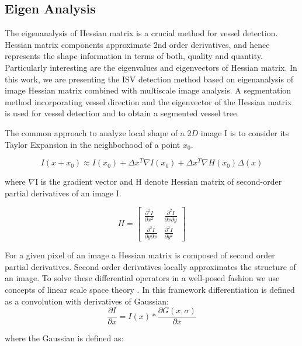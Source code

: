 \subsection{Eigen Analysis}

The eigenanalysis of Hessian matrix is a crucial method for vessel detection. Hessian matrix components approximate 2nd order derivatives, and hence represents the shape information in terms of both, quality and quantity. Particularly interesting are the eigenvalues and eigenvectors of Hessian matrix. In this work, we are presenting the ISV detection method based on eigenanalysis of image Hessian matrix combined with multiscale image analysis. A segmentation method incorporating vessel direction and the eigenvector of the Hessian matrix is used for vessel detection and to obtain a segmented vessel tree.

The common approach to analyze local shape of a $2D$ image I is to consider its Taylor Expansion in the neighborhood of a point $x_{0}$. 

\begin{equation}
I(x + x_{0}) \approx I(x_{0}) + \Delta x^{T} \nabla I(x_{0}) + \Delta x^{T} \nabla H(x_{0}) \Delta (x)
\end{equation}

where $\nabla$I is the gradient vector and H denote Hessian matrix of second-order partial derivatives of an image I.

\begin{equation}
H = \begin{bmatrix}
\frac{\partial^2 I}{\partial x^2}&\frac{\partial^2 I}{\partial x \partial y}\\ \frac{\partial^2 I}{\partial y \partial x}&\frac{\partial^2 I}{\partial y^2}
\end{bmatrix}
\end{equation}

For a given pixel of an image a Hessian matrix is composed of second order partial derivatives. Second order derivatives locally approximates the structure of an image. To solve these differential operators in a well-posed fashion we use concepts of linear scale space theory \cite{Koenderink84}. In this framework differentiation is defined as a convolution with derivatives of Gaussian:
\begin{equation}
\frac{\partial I}{\partial x} = I(x) * \frac{\partial G(x,\sigma)}{\partial x}
\end{equation}

where the Gaussian is defined as:

